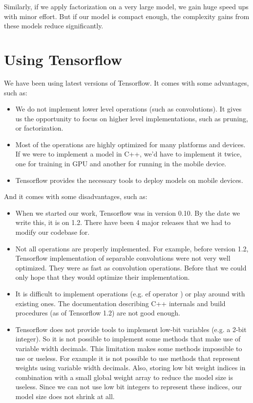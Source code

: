 Similarly, if we apply factorization on a very large model, we gain huge speed ups with minor effort. But if our model is compact enough, the complexity gains from these models reduce significantly.

\section{Using Tensorflow}
We have been using latest versions of Tensorflow. It comes with some advantages, such as:
\begin{itemize}
\item We do not implement lower level operations (such as convolutions). It gives us the opportunity to focus on higher level implementations, such as pruning, or factorization. 
\item Most of the operations are highly optimized for many platforms and devices. If we were to implement a model in C++, we'd have to implement it twice, one for training in GPU and another for running in the mobile device. 
\item Tensorflow provides the necessary tools to deploy models on mobile devices.
\end{itemize}

And it comes with some disadvantages, such as:

\begin{itemize}
\item When we started our work, Tensorflow was in version 0.10. By the date we write this, it is on 1.2. There have been 4 major releases that we had to modify our codebase for.
\item Not all operations are properly implemented. For example, before version 1.2, Tensorflow implementation of separable convolutions were not very well optimized. They were as fast as convolution operations. Before that we could only hope that they would optimize their implementation.
\item It is difficult to implement operations (e.g. ef operator \cite{afrasiyabi2017energy}) or play around with existing ones. The documentation describing C++ internals and build procedures (as of Tensorflow 1.2) are not good enough. 
\item Tensorflow does not provide tools to implement low-bit variables (e.g. a 2-bit integer). So it is not possible to implement some methods that make use of variable width decimals. This limitation makes some methods impossible to use or useless. For example it is not possible to use methods that represent weights using variable width decimals. Also, storing low bit weight indices in combination with a small global weight array to reduce the model size is useless. Since we can not use low bit integers to represent these indices, our model size does not shrink at all.
\end{itemize}

